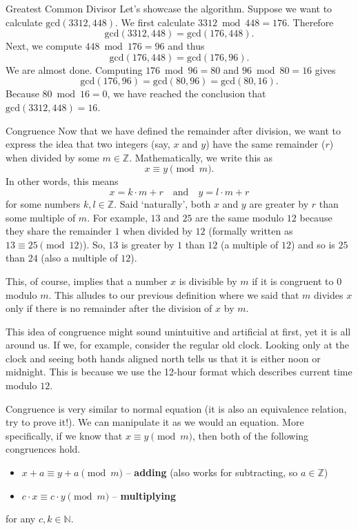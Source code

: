 \documentclass[final]{beamer}
\newlength{\colwidth}
\newcommand{\N}{\mathbb{N}}
\newcommand{\Z}{\mathbb{Z}}
\begin{document}
\begin{frame}[t]
\begin{columns}[t]
\begin{column}{\colwidth}
\begin{exampleblock}{Greatest Common Divisor}
 Let's showcase the algorithm. Suppose we want to calculate $\mathrm{gcd}(3312,
 448)$. We first calculate $3312 \bmod 448 = 176$. Therefore
 \[
  \mathrm{gcd}(3312, 448) = \mathrm{gcd}(176, 448).
 \]
 Next, we compute $448 \bmod 176 = 96$ and thus
 \[
  \mathrm{gcd}(176, 448) = \mathrm{gcd}(176, 96).
 \]
 We are almost done. Computing $176 \bmod 96 = 80$ and $96 \bmod 80 = 16$ gives
 \[
  \mathrm{gcd}(176, 96) = \mathrm{gcd}(80, 96) = \mathrm{gcd}(80, 16).
 \]
 Because $80 \bmod 16 = 0$, we have reached the conclusion that
 $\mathrm{gcd}(3312, 448) = 16$.
\end{exampleblock}

\begin{block}{Congruence}
 Now that we have defined the remainder after division, we want to express the
 idea that two integers (say, $x$ and $y$) \alert{have the same remainder} ($r$)
 \alert{when divided by some $m \in \Z$}. Mathematically, we write this as
 \[
  x \equiv y \pmod{m}.
 \]
 In other words, this means
 \[
  x = k \cdot m + r \quad \text{and} \quad y = l \cdot m + r
 \]
 for some numbers $k,l \in \Z$. Said `naturally', both $x$ and $y$ are greater
 by $r$ than some multiple of $m$. For example, $13$ and $25$ are the same
 modulo $12$ because they share the remainder $1$ when divided by $12$ (formally
 written as  $13 \equiv 25 \pmod{12}$). So, $13$ is greater by $1$ than $12$ (a
 multiple of $12$) and so is $25$ than $24$ (also a multiple of $12$). 

 This, of course, implies that a number $x$ is \alert{divisible by $m$} if
 \alert{it is congruent to $0$} modulo $m$. This alludes to our previous
 definition where we said that $m$ divides $x$ only if there is no remainder
 after the division of $x$ by $m$.

 This idea of congruence might sound unintuitive and artificial at first, yet it
 is all around us. If we, for example, consider the regular old clock. Looking
 only at the clock and seeing both hands aligned north tells us that it is
 either noon or midnight. This is because we use the 12-hour format which
 describes current time modulo $12$.

 \alert{Congruence is very similar to normal equation} (it is also an
 equivalence relation, try to prove it!). We can manipulate it as we would an
 equation. More specifically, if we know that $x \equiv y \pmod{m}$, then both
 of the following congruences hold.
 \begin{itemize}[label=\textbullet,left=24pt]
  \item $x+a \equiv y+a \pmod{m}$ -- \textbf{adding} (also works for subtracting,
   so $a \in \mathbb{Z}$)
  \item $c \cdot x \equiv c \cdot y \pmod{m}$ -- \textbf{multiplying}
 \end{itemize}
 for any $c,k \in \N$.


\end{block}
\end{column}
\end{columns}
\end{frame}
\end{document}
